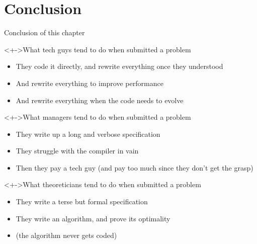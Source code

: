 \section{Conclusion}
\begin{frame}[squeeze]{Conclusion of this chapter}
  ~\vspace{-1.5\baselineskip}
  \begin{block}<+->{What tech guys tend to do when submitted a problem}
    \vspace{-.4\baselineskip}
    \begin{itemize}
    \item They code it directly, and rewrite everything once they
      understood
    \item And rewrite everything to improve performance
    \item And rewrite everything when the code needs to evolve
    \end{itemize}
  \end{block}\vspace{-.6\baselineskip}

  \begin{block}<+->{What managers tend to do when submitted a problem}
    \vspace{-.4\baselineskip}
    \begin{itemize}
    \item They write up a long and verbose specification
    \item They struggle with the compiler in vain
    \item Then they pay a tech guy 
      {\small(and pay too much since they don't get the grasp)}
    \end{itemize}
  \end{block}\vspace{-.6\baselineskip}

  \begin{block}<+->{What theoreticians tend to do when submitted a problem}
    \vspace{-.4\baselineskip}
    \begin{itemize}
    \item They write a terse but formal specification
    \item They write an algorithm, and prove its optimality
    \item[] (the algorithm never gets coded)
    \end{itemize}
  \end{block}\vspace{-.6\baselineskip}


\end{frame}
